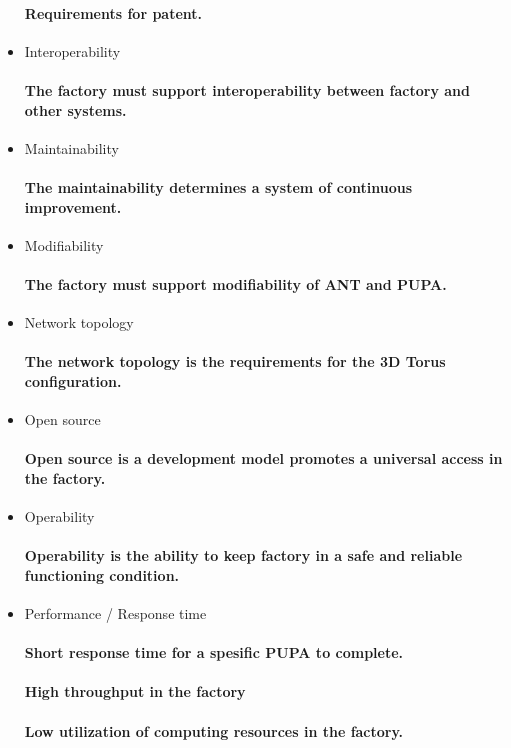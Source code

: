\begin{itemize}
  \paragraph{Requirements for patent.}
  \item Interoperability
  \paragraph{The factory must support interoperability between factory and other systems.}
  \item Maintainability
  \paragraph{The maintainability determines a system of continuous improvement.}
  \item Modifiability
  \paragraph{The factory must support modifiability of ANT and PUPA.}
  \item Network topology
  \paragraph{The network topology is the requirements for the 3D Torus configuration.}
  \item Open source
  \paragraph{Open source is a development model promotes a universal access in the factory.}
  \item Operability
  \paragraph{Operability is the ability to keep factory in a safe and reliable functioning condition.}
  \item Performance / Response time
  \paragraph{Short response time for a spesific PUPA to complete.}
  \paragraph{High throughput in the factory}
  \paragraph{Low utilization of computing resources in the factory.}

\end{itemize}
